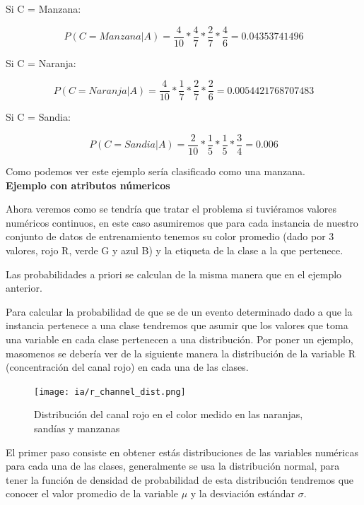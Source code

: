 \documentclass[11pt,fleqn]{book} %
\begin{document}
Si C = Manzana:

\begin{equation}
P(C=Manzana|A) = \frac{4}{10}*\frac{4}{7}*\frac{2}{7}*\frac{4}{6} = 0.04353741496
\label{eqn:clasificadorEjemplo1} 
\end{equation}

Si C = Naranja:

\begin{equation}
P(C=Naranja|A) = \frac{4}{10}*\frac{1}{7}*\frac{2}{7}*\frac{2}{6} = 0.0054421768707483
\label{eqn:clasificadorEjemplo2} 
\end{equation}

Si C = Sandia:

\begin{equation}
P(C=Sandia|A) = \frac{2}{10}*\frac{1}{5}*\frac{1}{5}*\frac{3}{4} = 0.006
\label{eqn:clasificadorEjemplo3} 
\end{equation}

Como podemos ver este ejemplo sería clasificado como una manzana.\\

\textbf{Ejemplo con atributos númericos}

Ahora veremos como se tendría que tratar el problema si tuviéramos valores numéricos continuos, en este caso asumiremos que para cada instancia de nuestro conjunto de datos de entrenamiento tenemos su color promedio (dado por 3 valores, rojo R, verde G y azul B) y la etiqueta de la clase a la que pertenece.

Las probabilidades a priori se calculan de la misma manera que en el ejemplo anterior.

Para calcular la probabilidad de que se de un evento determinado dado a que la instancia pertenece a una clase tendremos que asumir que los valores que toma una variable en cada clase pertenecen a una distribución. Por poner un ejemplo, masomenos se debería ver de la siguiente manera la distribución de la variable R (concentración del canal rojo) en cada una de las clases.

\begin{figure}[ht]
\centering\texttt{[image: ia/r\_channel\_dist.png]}
\caption{Distribución del canal rojo en el color medido en las naranjas, sandías y manzanas}

\label{fig:distributionchannelr} 
\end{figure}

El primer paso consiste en obtener estás distribuciones de las variables numéricas para cada una de las clases, generalmente se usa la distribución normal, para tener la función de densidad de probabilidad de esta distribución tendremos que conocer el valor promedio de la variable $\mu$ y la desviación estándar $\sigma$.
\end{document}
